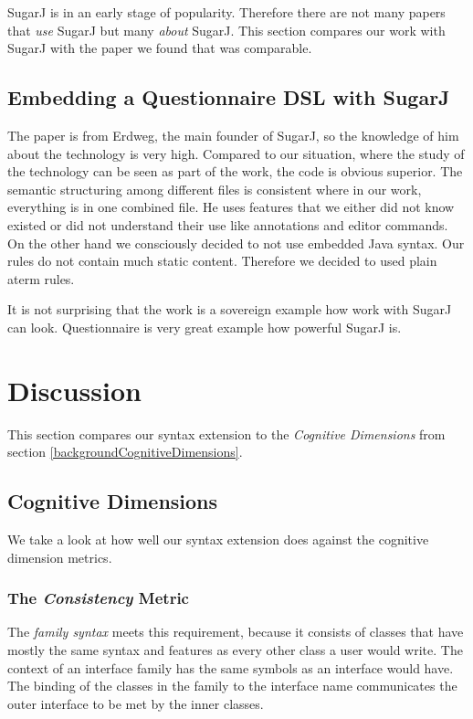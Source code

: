 \documentclass{report}
\begin{document}
SugarJ is in an early stage of popularity. Therefore there are not many papers that \emph{use} SugarJ but many \emph{about} SugarJ. This section compares our work with SugarJ with the paper we found that was comparable.

\subsection{Embedding a Questionnaire DSL with SugarJ \cite{Erdweg-Questionnaire-2013}}

The paper is from Erdweg, the main founder of SugarJ, so the knowledge of him about the technology is very high. Compared to our situation, where the study of the technology can be seen as part of the work, the code is obvious superior. The semantic structuring among different files is consistent where in our work, everything is in one combined file. He uses features that we either did not know existed or did not understand their use like annotations and editor commands. On the other hand we consciously decided to not use embedded Java syntax. Our rules do not contain much static content. Therefore we decided to used plain aterm rules.

It is not surprising that the work is a sovereign example how work with SugarJ can look. Questionnaire is very great example how powerful SugarJ is.


\section{Discussion}

This section compares our syntax extension to the \emph{Cognitive Dimensions} from section \ref{backgroundCognitiveDimensions}.

\subsection{Cognitive Dimensions}

We take a look at how well our syntax extension does against the cognitive dimension metrics.

\subsubsection*{The \emph{Consistency} Metric}

The \emph{family syntax} meets this requirement, because it consists of classes that have mostly the same syntax and features as every other class a user would write. The context of an interface family has the same symbols as an interface would have. The binding of the classes in the family to the interface name communicates the outer interface to be met by the inner classes.
\end{document}
